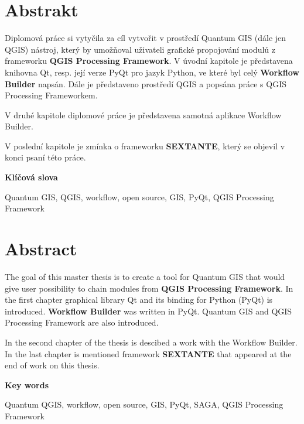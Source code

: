 \section*{Abstrakt}\label{abstrakt}
\indent Diplomová práce si vytyčila za cíl vytvořit v prostředí
Quantum GIS (dále jen QGIS) nástroj, který by umožňoval uživateli
grafické propojování modulů z frameworku \textbf{QGIS Processing
  Framework}. V úvodní kapitole je představena knihovna Qt, resp. její
verze PyQt pro jazyk Python, ve které byl celý \textbf{Workflow
  Builder} napsán. Dále je představeno prostředí QGIS a popsána práce
s QGIS Processing Frameworkem.

V druhé kapitole diplomové práce je představena samotná aplikace
Workflow Build\-er.

V poslední kapitole je zmínka o frameworku \textbf{SEXTANTE}, který se
objevil v konci psaní této práce.

\textbf{Klíčová slova}

Quantum GIS, QGIS, workflow, open source, GIS, PyQt, QGIS Processing Framework


\vfill

\section*{Abstract}
\indent The goal of this master thesis is to create a tool for Quantum GIS 
that would give user possibility to chain modules from \textbf{QGIS Processing 
Framework}. In the first chapter graphical library Qt and its binding for Python 
(PyQt) is introduced. \textbf{Workflow Builder} was written in PyQt. Quantum GIS and 
QGIS Processing Framework are also introduced.

In the second chapter of the thesis is descibed a work with the 
Workflow Builder. In the last chapter is mentioned framework \textbf{SEXTANTE} 
that appeared at the end of work on this thesis.

\textbf{Key words}

Quantum QGIS, workflow, open source, GIS, PyQt, SAGA, QGIS Processing Framework
